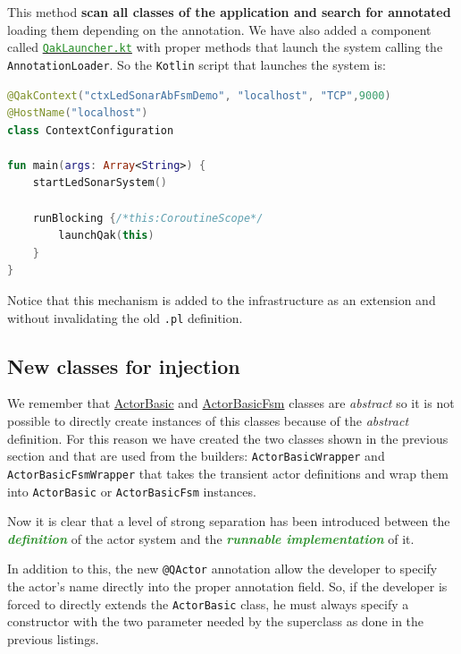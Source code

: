 This method \textbf{scan all classes of the application and search for annotated} loading them depending on the annotation. We have also added a component called \href{https://github.com/LM-96/QA-Extensions/blob/main/it.unibo.qakactor/src/main/kotlin/QakLauncher.kt}{\textcolor{ForestGreen}{\texttt{QakLauncher.kt}}} with proper methods that launch the system calling the \texttt{AnnotationLoader}. So the \texttt{Kotlin} script that launches the system is:

\begin{lstlisting}[caption=\texttt{App.kt} (\texttt{ledsonarsystem0}), language=Kotlin]
@QakContext("ctxLedSonarAbFsmDemo", "localhost", "TCP",9000)
@HostName("localhost")
class ContextConfiguration

fun main(args: Array<String>) {
	startLedSonarSystem()
	
	runBlocking {/*this:CoroutineScope*/
		launchQak(this)
	}
}
\end{lstlisting}

Notice that this mechanism is added to the infrastructure as an extension and without invalidating the old \texttt{.pl} definition. 

\subsection{New classes for injection}

We remember that \href{https://github.com/anatali/issLab2021/blob/main/it.unibo.qakactor/src/main/kotlin/ActorBasic.kt}{ActorBasic} and \href{https://github.com/anatali/issLab2021/blob/main/it.unibo.qakactor/src/main/kotlin/ActorBasicFsm.kt}{ActorBasicFsm} classes are \textit{abstract} so it is not possible to directly create instances of this classes because of the \textit{abstract} definition.
For this reason we have created the two classes shown in the previous section and that are used from the builders: \texttt{ActorBasicWrapper} and \texttt{ActorBasicFsmWrapper} that takes the transient actor definitions and wrap them into \texttt{ActorBasic} or \texttt{ActorBasicFsm} instances.

Now it is clear that a level of strong separation has been introduced between the \textcolor{ForestGreen}{\textbf{\textit{definition}}} of the actor system and the \textcolor{ForestGreen}{\textbf{\textit{runnable implementation}}} of it.

In addition to this, the new \texttt{@QActor} annotation allow the developer to specify the actor's name directly into the proper annotation field. So, if the developer is forced to directly extends the \texttt{ActorBasic} class, he must always specify a constructor with the two parameter needed by the superclass as done in the previous listings.

